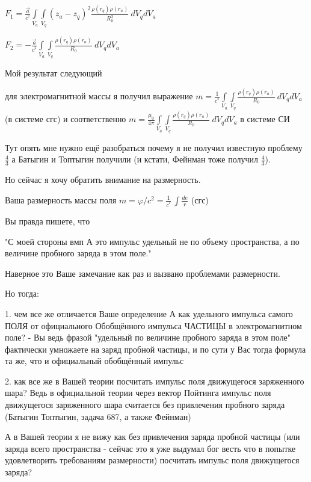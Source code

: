 \documentclass{article}
\begin{document}
${{F}_{1}}=\frac{\overrightarrow{a}}{{{c}^{^{2}}}}\int\limits_{{{V}_{a}}}{\int\limits_{{{V}_{q}}}{\left( {{z}_{a}}-{{z}_{q}} \right)^2\frac{\rho \left( {{r}_{q}} \right)\rho \left( {{r}_{a}} \right)}{R_{0}^3}}}\ d{{V}_{q}}d{{V}_{a}}$


${{F}_{2}}=-\frac{\overrightarrow{a}}{{{c}^{^{2}}}}\int\limits_{{{V}_{a}}}{\int\limits_{{{V}_{q}}}{\frac{\rho \left( {{r}_{q}} \right)\rho \left( {{r}_{a}} \right)}{R_{0}}}}\ d{{V}_{q}}d{{V}_{a}}$


Мой результат следующий

для электромагнитной массы я получил выражение
$m=\frac{1}{{{c}^{^{2}}}}\int\limits_{{{V}_{a}}}{\int\limits_{{{V}_{q}}}{\frac{\rho \left( {{r}_{q}} \right)\rho \left( {{r}_{a}} \right)}{R_{0}}}}\ d{{V}_{q}}d{{V}_{a}}$ (в системе сгс) и соответственно $m=\frac{{{\mu }_{0}}}{4\pi }\int\limits_{{{V}_{a}}}{\int\limits_{{{V}_{q}}}{\frac{\rho \left( {{r}_{q}} \right)\rho \left( {{r}_{a}} \right)}{R_{0}}}}\ d{{V}_{q}}d{{V}_{a}}$ в системе СИ

Тут опять мне нужно ещё разобраться почему я не получил известную проблему $\frac{4}{3}$ а Батыгин и Топтыгин получили (и кстати, Фейнман тоже получил $\frac{4}{3}$).

Но сейчас я хочу обратить внимание на размерность. 

Ваша размерность массы поля $m = \varphi/c^2 =\frac{1}{{{c}^{^{2}}}}\,\int\frac{de}{r}$ (сгс)

Вы правда пишете, что 

"С моей стороны вмп А это импульс удельный не по объему пространства, а по величине пробного заряда в этом поле." 

Наверное это Ваше замечание как раз и вызвано проблемами размерности.

Но тогда:

1. чем все же отличается Ваше определение А как удельного импульса самого ПОЛЯ от официального Обобщённого импульса ЧАСТИЦЫ в электромагнитном поле? - Вы ведь фразой "удельный по величине пробного заряда в этом поле" фактически умножаете на заряд пробной частицы, и по сути у Вас тогда формула та же, что и официальный обобщённый импульс

2. как все же в Вашей теории посчитать импульс поля движущегося заряженного шара? Ведь в официальной теории через вектор Пойтинга импульс поля движущегося заряженного шара считается без привлечения пробного заряда (Батыгин Топтыгин, задача 687, а также Фейнман)

А в Вашей теории я не вижу как без привлечения заряда пробной частицы (или заряда всего пространства - сейчас это я уже выдумал бог весть что в попытке удовлетворить требованиям размерности)  посчитать импульс поля движущегося заряда?
\end{document}
